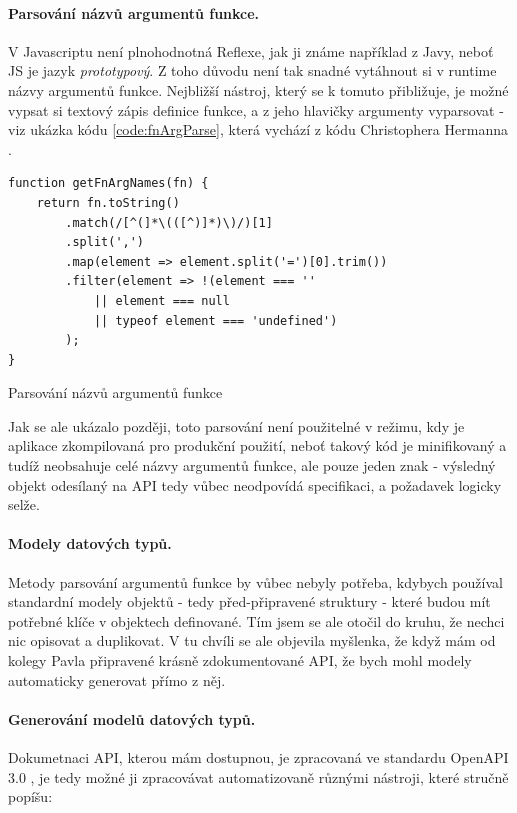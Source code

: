 \paragraph{Parsování názvů argumentů funkce.} V Javascriptu není plnohodnotná Reflexe, jak ji známe například z Javy, neboť JS je jazyk \emph{prototypový}. Z toho důvodu není tak snadné vytáhnout si v runtime názvy argumentů funkce. Nejbližší nástroj, který se k tomuto přibližuje, je možné vypsat si textový zápis definice funkce, a z jeho hlavičky argumenty vyparsovat - viz ukázka kódu \ref{code:fnArgParse}, která vychází z kódu Christophera Hermanna \cite{fn-parse}.

\begin{listing}[h]
\begin{verbatim}
function getFnArgNames(fn) {
    return fn.toString()
        .match(/[^(]*\(([^)]*)\)/)[1]
        .split(',')
        .map(element => element.split('=')[0].trim())
        .filter(element => !(element === '' 
            || element === null 
            || typeof element === 'undefined')
        );
}
\end{verbatim}
\caption{Parsování názvů argumentů funkce} \label{code:fnArgParse}
\end{listing}

Jak se ale ukázalo později, toto parsování není použitelné v režimu, kdy je aplikace zkompilovaná pro produkční použití, neboť takový kód je minifikovaný a tudíž neobsahuje celé názvy argumentů funkce, ale pouze jeden znak - výsledný objekt odesílaný na API tedy vůbec neodpovídá specifikaci, a požadavek logicky selže.

\paragraph{Modely datových typů.} Metody parsování argumentů funkce by vůbec nebyly potřeba, kdybych používal standardní modely objektů - tedy před-připravené struktury - které budou mít potřebné klíče v objektech definované. Tím jsem se ale otočil do kruhu, že nechci nic opisovat a duplikovat. V tu chvíli se ale objevila myšlenka, že když mám od kolegy Pavla připravené krásně zdokumentované API, že bych mohl modely automaticky generovat přímo z něj.

\paragraph{Generování modelů datových typů.} Dokumetnaci API, kterou mám dostupnou, je zpracovaná ve standardu OpenAPI 3.0 \cite{openapi-spec}, je tedy možné ji zpracovávat automatizovaně různými nástroji, které stručně popíšu:

